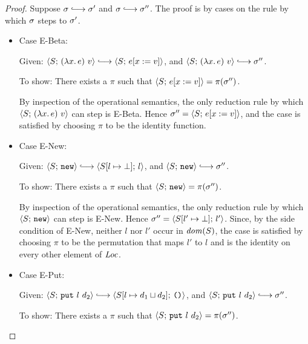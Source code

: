 \begin{proof}
  Suppose $\conf \parstepsto \conf'$ and $\conf \parstepsto \conf''$.
  The proof is by cases on the rule by which $\sigma$ steps to
  $\sigma'$.


  \begin{itemize}

    \item Case {\sc E-Beta}:

      Given:
      $\config{S}{\app{(\lam{x}{e})}{v}} \parstepsto \config{S}{\subst{e}{x}{v}}$,
      and $\config{S}{\app{(\lam{x}{e})}{v}} \parstepsto \conf''$.

      To show: There exists a $\pi$ such that
      $\langle S;\, e[x := v] \rangle = \pi(\sigma'')$.

      By inspection of the operational semantics, the only reduction
      rule by which $\langle S;\, (\lambda x.\,e)~v \rangle$ can step is
      {\sc E-Beta}.  Hence $\sigma'' = \langle S;\, e[x := v] \rangle$,
      and the case is satisfied by choosing $\pi$ to be the identity
      function.

      \item Case {\sc E-New}: 

      Given:
      $\config{S}{\NEW} \parstepsto \config{\extSRaw{S}{l}{\bot}}{l}$,
      and $\config{S}{\NEW} \parstepsto \conf''$.

      To show: There exists a $\pi$ such that $\langle S;\, \mbox{\texttt{new}} \rangle
      = \pi(\sigma'')$.

      By inspection of the operational semantics, the only reduction
      rule by which $\langle S;\, \mbox{\texttt{new}} \rangle$ can step is {\sc E-New}.  Hence
      $\sigma'' = \langle S[l' \mapsto \bot];\, l' \rangle$.  Since, by the
      side condition of {\sc E-New}, neither $l$ nor $l'$ occur in
      $\mathit{dom}(S)$, the case is satisfied by choosing $\pi$ to be the
      permutation that maps $l'$ to $l$ and is the identity on every
      other element of $\mathit{Loc}$.

      \item Case {\sc E-Put}:

      Given:
      $\config{S}{\putexp{l}{d_2}} \parstepsto \config{\extSRaw{S}{l}{\userlub{d_1}{d_2}}}{\unit}$,
      and $\config{S}{\putexp{l}{d_2}} \parstepsto \conf''$.

      To show: There exists a $\pi$ such that
      $\langle S;\, \mbox{\texttt{put}}~l~d_2 \rangle = \pi(\sigma'')$.


\end{itemize}
\end{proof}
